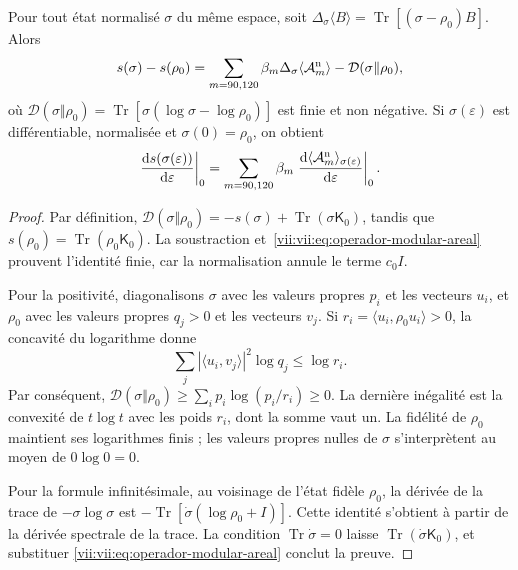 \begin{theorem}
\label{vii:vii:thm:ley-modular-finita}
Pour tout état normalisé \(\sigma\) du même espace, soit
\(\Delta_\sigma\langle B\rangle
=\operatorname{Tr}[(\sigma-\rho_0)B]\). Alors
\begin{equation}
 s(\sigma)-s(\rho_0)
 =\sum_{m=90,120}\beta_m\Delta_\sigma\langle\mathcal A_m^{\rm n}\rangle
  -\mathcal D(\sigma\Vert\rho_0),
 \label{vii:vii:eq:ley-modular-finita}
\end{equation}
où
\(\mathcal D(\sigma\Vert\rho_0)
=\operatorname{Tr}[\sigma(\log\sigma-\log\rho_0)]\)
est finie et non négative. Si \(\sigma(\varepsilon)\) est différentiable,
normalisée et \(\sigma(0)=\rho_0\), on obtient
\begin{equation}
 \left.\frac{\mathrm ds(\sigma(\varepsilon))}{\mathrm d\varepsilon}\right|_0
 =\sum_{m=90,120}\beta_m
   \left.\frac{\mathrm d\langle\mathcal A_m^{\rm n}\rangle_{
                 \sigma(\varepsilon)}}{\mathrm d\varepsilon}\right|_0.
 \label{vii:vii:eq:primera-ley-modular}
\end{equation}
\end{theorem}
\begin{proof}
Par définition,
\(\mathcal D(\sigma\Vert\rho_0)=-s(\sigma)
+\operatorname{Tr}(\sigma\mathsf K_0)\), tandis que
\(s(\rho_0)=\operatorname{Tr}(\rho_0\mathsf K_0)\).
La soustraction et~\eqref{vii:vii:eq:operador-modular-areal} prouvent l'identité
finie, car la normalisation annule le terme \(c_0I\).

Pour la positivité, diagonalisons \(\sigma\) avec les valeurs propres \(p_i\) et les vecteurs \(u_i\), et \(\rho_0\) avec les valeurs propres \(q_j>0\) et les vecteurs \(v_j\). Si \(r_i=\langle u_i,\rho_0u_i\rangle>0\), la concavité du logarithme donne
\[
 \sum_j|\langle u_i,v_j\rangle|^2\log q_j\le\log r_i.
\]
Par conséquent,
\(\mathcal D(\sigma\Vert\rho_0)
\ge\sum_i p_i\log(p_i/r_i)\ge0\).
La dernière inégalité est la convexité de \(t\log t\) avec les poids
\(r_i\), dont la somme vaut un. La fidélité de \(\rho_0\) maintient
ses logarithmes finis ; les valeurs propres nulles de \(\sigma\)
s'interprètent au moyen de \(0\log0=0\).

Pour la formule infinitésimale, au voisinage de l'état fidèle \(\rho_0\),
la dérivée de la trace de \(-\sigma\log\sigma\) est
\(-\operatorname{Tr}[\dot\sigma(\log\rho_0+I)]\).
Cette identité s'obtient à partir de la dérivée spectrale de la trace.
La condition \(\operatorname{Tr}\dot\sigma=0\) laisse
\(\operatorname{Tr}(\dot\sigma\mathsf K_0)\), et substituer
\eqref{vii:vii:eq:operador-modular-areal} conclut la preuve.
\end{proof}

